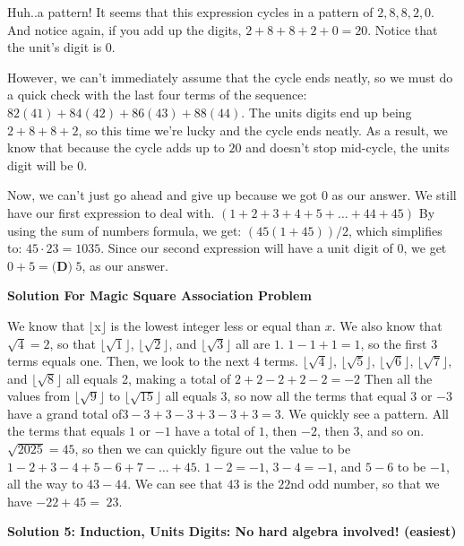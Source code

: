 \begin{enumerate}
 Huh..a pattern! It seems that this expression cycles in a pattern of $2,8,8,2,0$. And notice again, if you add up the digits, $2+8+8+2+0=20$. Notice that the unit's digit is $0$. 

 However, we can't immediately assume that the cycle ends neatly, so we must do a quick check with the last four terms of the sequence: $82(41)+84(42)+86(43)+88(44)$. The units digits end up being $2+8+8+2$, so this time we're lucky and the cycle ends neatly. As a result, we know that because the cycle adds up to $20$ and doesn't stop mid-cycle, the units digit will be $0.$

 Now, we can't just go ahead and give up because we got $0$ as our answer. We still have our first expression to deal with. $(1+2+3+4+5+\dots+44+45)$ By using the sum of numbers formula, we get: $(45(1+45))/2$, which simplifies to: $45\cdot23 = 1035.$ Since our second expression will have a unit digit of $0$, we get $0+5 = \boxed{\textbf{(D)}\hspace{3pt}5}$, as our answer.

 



\textbf{Solution For Magic Square Association Problem}

We know that $\lfloor$x$\rfloor$ is the lowest integer less or equal than $x$. We also know that $\sqrt{4}=2$, so that $\lfloor \sqrt{1} \rfloor$, $\lfloor \sqrt{2} \rfloor$, and $\lfloor \sqrt{3}\rfloor$ all are $1$. $1-1+1=1$, so the first $3$ terms equals one. Then, we look to the next $4$ terms. $\lfloor \sqrt{4} \rfloor$, $\lfloor \sqrt{5} \rfloor$, $\lfloor \sqrt{6} \rfloor$, $\lfloor \sqrt{7} \rfloor$, and $\lfloor \sqrt{8} \rfloor$ all equals 2, making a total of $2+2-2+2-2=-2$ Then all the values from $\lfloor \sqrt{9} \rfloor$ to $\lfloor \sqrt{15} \rfloor$ all equals 3, so now all the terms that equal $3$ or $-3$ have a grand total of$3-3+3-3+3-3+3=3$. We quickly see a pattern. All the terms that equals $1$ or $-1$ have a total of $1$, then $-2$, then $3$, and so on. $\sqrt{2025}=45$, so then we can quickly figure out the value to be $1-2+3-4+5-6+7-\dots+45$. $1-2=-1$, $3-4=-1$, and $5-6$ to be $-1$, all the way to $43-44$. We can see that $43$ is the $22$nd odd number, so that we have $-22+45=\boxed{\textbf{}\hspace{3pt}23}$.

 



\textbf{Solution 5: Induction, Units Digits: No hard algebra involved! (easiest)}


\end{enumerate}
